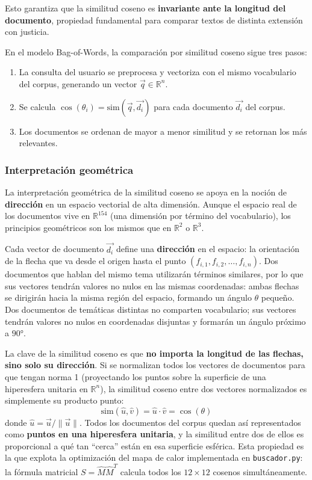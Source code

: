 Esto garantiza que la similitud coseno es \textbf{invariante ante la longitud del documento}, propiedad fundamental para comparar textos de distinta extensión con justicia.

En el modelo Bag-of-Words, la comparación por similitud coseno sigue tres pasos:
\begin{enumerate}
    \item La consulta del usuario se preprocesa y vectoriza con el mismo vocabulario del corpus, generando un vector $\vec{q} \in \mathbb{R}^n$.
    \item Se calcula $\cos(\theta_i) = \text{sim}(\vec{q}, \vec{d_i})$ para cada documento $\vec{d_i}$ del corpus.
    \item Los documentos se ordenan de mayor a menor similitud y se retornan los más relevantes.
\end{enumerate}

\subsubsection{Interpretación geométrica}

La interpretación geométrica de la similitud coseno se apoya en la noción de \textbf{dirección} en un espacio vectorial de alta dimensión. Aunque el espacio real de los documentos vive en $\mathbb{R}^{154}$ (una dimensión por término del vocabulario), los principios geométricos son los mismos que en $\mathbb{R}^2$ o $\mathbb{R}^3$.

Cada vector de documento $\vec{d_i}$ define una \textbf{dirección} en el espacio: la orientación de la flecha que va desde el origen hasta el punto $(f_{i,1}, f_{i,2}, \ldots, f_{i,n})$. Dos documentos que hablan del mismo tema utilizarán términos similares, por lo que sus vectores tendrán valores no nulos en las mismas coordenadas: ambas flechas se dirigirán hacia la misma región del espacio, formando un ángulo $\theta$ pequeño. Dos documentos de temáticas distintas no comparten vocabulario; sus vectores tendrán valores no nulos en coordenadas disjuntas y formarán un ángulo próximo a $90°$.

La clave de la similitud coseno es que \textbf{no importa la longitud de las flechas, sino solo su dirección}. Si se normalizan todos los vectores de documentos para que tengan norma 1 (proyectando los puntos sobre la superficie de una hiperesfera unitaria en $\mathbb{R}^n$), la similitud coseno entre dos vectores normalizados es simplemente su producto punto:
\[
\text{sim}(\hat{u}, \hat{v}) = \hat{u} \cdot \hat{v} = \cos(\theta)
\]
donde $\hat{u} = \vec{u}/\|\vec{u}\|$. Todos los documentos del corpus quedan así representados como \textbf{puntos en una hiperesfera unitaria}, y la similitud entre dos de ellos es proporcional a qué tan ``cerca'' están en esa superficie esférica. Esta propiedad es la que explota la optimización del mapa de calor implementada en \texttt{buscador.py}: la fórmula matricial $S = \hat{M}\hat{M}^T$ calcula todos los $12 \times 12$ cosenos simultáneamente.

